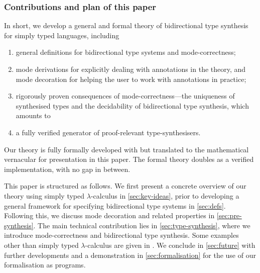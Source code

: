 \subsubsection{Contributions and plan of this paper}

%
In short, we develop a general and formal theory of bidirectional type synthesis for simply typed languages, including 
\begin{enumerate}
  \item general definitions for bidirectional type systems and mode-correctness;
  \item mode derivations for explicitly dealing with annotations in the theory, and mode decoration for helping the user to work with annotations in practice;
  \item rigorously proven consequences of mode-correctness---the uniqueness of synthesised types and the decidability of bidirectional type synthesis, which amounts to
  \item a fully verified generator of proof-relevant type-synthesisers.
\end{enumerate}
Our theory is fully formally developed with \Agda but translated to the mathematical vernacular for presentation in this paper.
The formal theory doubles as a verified implementation, with no gap in between.


This paper is structured as follows.
We first present a concrete overview of our theory using simply typed $\lambda$-calculus in \cref{sec:key-ideas}, prior to developing a general framework for specifying bidirectional type systems in \cref{sec:defs}.
Following this, we discuss mode decoration and related properties in \cref{sec:pre-synthesis}.
The main technical contribution lies in \cref{sec:type-synthesis}, where we introduce mode-correctness and bidirectional type synthesis.
Some examples other than simply typed $\lambda$-calculus are given in .
We conclude in \cref{sec:future} with further developments and a demonstration in \cref{sec:formalisation} for the use of our \Agda formalisation as programs.
